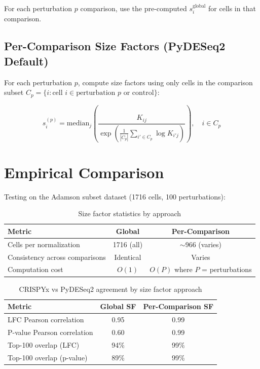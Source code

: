 \documentclass[11pt]{article}
\begin{document}
For each perturbation $p$ comparison, use the pre-computed $s_i^{\text{global}}$ for cells in that comparison.

\subsection{Per-Comparison Size Factors (PyDESeq2 Default)}

For each perturbation $p$, compute size factors using only cells in the comparison subset $C_p = \{i : \text{cell } i \in \text{perturbation } p \text{ or control}\}$:

\begin{equation}
s_i^{(p)} = \text{median}_j \left( \frac{K_{ij}}{\exp\left( \frac{1}{|C_p|} \sum_{i' \in C_p} \log K_{i'j} \right)} \right), \quad i \in C_p
\end{equation}

\section{Empirical Comparison}

Testing on the Adamson subset dataset (1716 cells, 100 perturbations):

\begin{table}[h]
\centering
\caption{Size factor statistics by approach}
\begin{tabular}{lcc}
\toprule
\textbf{Metric} & \textbf{Global} & \textbf{Per-Comparison} \\
\midrule
Cells per normalization & 1716 (all) & $\sim$966 (varies) \\
Consistency across comparisons & Identical & Varies \\
Computation cost & $O(1)$ & $O(P)$ where $P$ = perturbations \\
\bottomrule
\end{tabular}
\end{table}

\begin{table}[h]
\centering
\caption{CRISPYx vs PyDESeq2 agreement by size factor approach}
\begin{tabular}{lcc}
\toprule
\textbf{Metric} & \textbf{Global SF} & \textbf{Per-Comparison SF} \\
\midrule
LFC Pearson correlation & 0.95 & 0.99 \\
P-value Pearson correlation & 0.60 & 0.99 \\
Top-100 overlap (LFC) & 94\% & 99\% \\
Top-100 overlap (p-value) & 89\% & 99\% \\
\bottomrule
\end{tabular}
\end{table}
\end{document}
